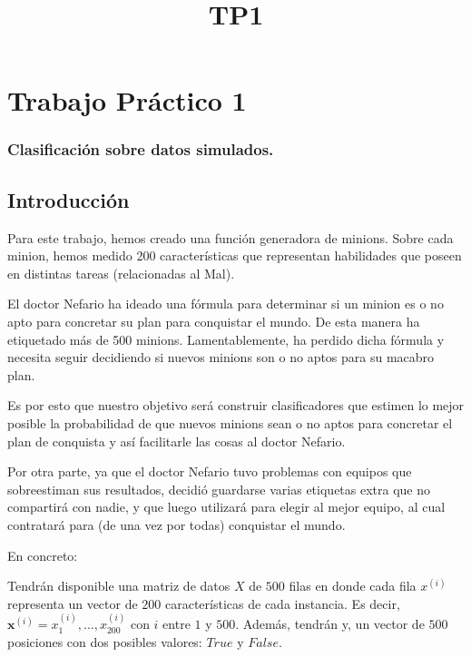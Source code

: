 \documentclass[11pt]{article}
\title{TP1}
\begin{document}
    
    
    \maketitle
    
    

    
    \section{Trabajo Práctico 1}\label{trabajo-pruxe1ctico-1}

\subsubsection{Clasificación sobre datos
simulados.}\label{clasificaciuxf3n-sobre-datos-simulados.}

\subsection{Introducción}\label{introducciuxf3n}

Para este trabajo, hemos creado una función generadora de minions. Sobre
cada minion, hemos medido 200 características que representan
habilidades que poseen en distintas tareas (relacionadas al Mal).

El doctor Nefario ha ideado una fórmula para determinar si un minion es
o no apto para concretar su plan para conquistar el mundo. De esta
manera ha etiquetado más de 500 minions. Lamentablemente, ha perdido
dicha fórmula y necesita seguir decidiendo si nuevos minions son o no
aptos para su macabro plan.

Es por esto que nuestro objetivo será construir clasificadores que
estimen lo mejor posible la probabilidad de que nuevos minions sean o no
aptos para concretar el plan de conquista y así facilitarle las cosas al
doctor Nefario.

Por otra parte, ya que el doctor Nefario tuvo problemas con equipos que
sobreestiman sus resultados, decidió guardarse varias etiquetas extra
que no compartirá con nadie, y que luego utilizará para elegir al mejor
equipo, al cual contratará para (de una vez por todas) conquistar el
mundo.

En concreto:

Tendrán disponible una matriz de datos \(X\) de \(500\) filas en donde
cada fila \(x^{(i)}\) representa un vector de \(200\) características de
cada instancia. Es decir,
\(\textbf{x}^{(i)} = x_1^{(i)}, \dots, x_{200}^{(i)}\) con \(i\) entre
\(1\) y \(500\). Además, tendrán y, un vector de \(500\) posiciones con
dos posibles valores: \(True\) y \(False\).
\end{document}
